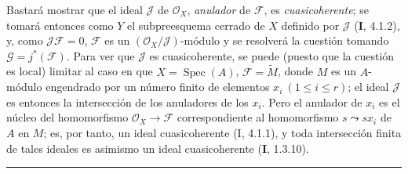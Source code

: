 Bastará mostrar que el ideal $\mathscr J$ de $\mathscr O_X$,
\emph{anulador} de $\mathscr F$, es \emph{cuasicoherente}; se tomará entonces
como $Y$ el subpreesquema cerrado de $X$ definido por $\mathscr J$ (\textbf I, 4.1.2),
y, como $\mathscr J\mathscr F=0$, $\mathscr F$ es un
$(\mathscr O_X/\mathscr J)$-módulo y se resolverá la cuestión tomando
$\mathscr G=j^*(\mathscr F)$. Para ver que $\mathscr J$ es cuasicoherente, se
puede (puesto que la cuestión es local) limitar al caso en que
$X=\operatorname{Spec}(A)$, $\mathscr F=\widetilde M$, donde $M$ es un
$A$-módulo engendrado por un número finito de elementos
$x_i\ (1\leq i\leq r)$; el ideal $\mathscr J$ es entonces la intersección de
los anuladores de los $x_i$. Pero el anulador de $x_i$ es el núcleo del
homomorfismo $\mathscr O_X\to\mathscr F$ correspondiente al homomorfismo
$s\leadsto sx_i$ de $A$ en $M$; es, por tanto, un ideal cuasicoherente (I,
4.1.1), y toda intersección finita de tales ideales es asimismo un ideal
cuasicoherente (\textbf I, 1.3.10).

\begin{center}\rule{25mm}{0.4pt}\end{center}
